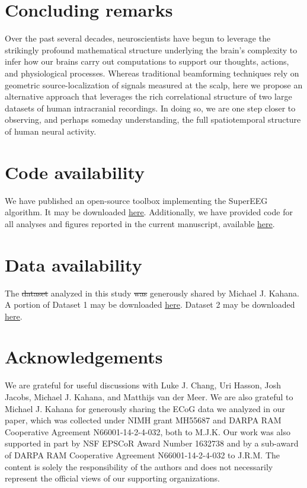 \documentclass[10pt]{article}
\providecommand{\DIFaddtex}[1]{{\protect\color{blue}\uwave{#1}}} %
\providecommand{\DIFdeltex}[1]{{\protect\color{red}\sout{#1}}}                      %
\providecommand{\DIFaddbegin}{} %
\providecommand{\DIFaddend}{} %
\providecommand{\DIFdelbegin}{} %
\providecommand{\DIFdelend}{} %
\providecommand{\DIFadd}[1]{\texorpdfstring{\DIFaddtex{#1}}{#1}} %
\providecommand{\DIFdel}[1]{\texorpdfstring{\DIFdeltex{#1}}{}} %
\newcommand{\DIFscaledelfig}{0.5}
\newlength{\DIFdelgraphicswidth} %
\newlength{\DIFdelgraphicsheight} %
\newcommand{\DIFaddincludegraphics}[2][]{{\color{blue}\fbox{\DIFOincludegraphics[#1]{#2}}}} %
\newcommand{\DIFdelincludegraphics}[2][]{%
\sbox{\DIFdelgraphicsbox}{\DIFOincludegraphics[#1]{#2}}%
\settoboxwidth{\DIFdelgraphicswidth}{\DIFdelgraphicsbox} %
\settoboxtotalheight{\DIFdelgraphicsheight}{\DIFdelgraphicsbox} %
\scalebox{\DIFscaledelfig}{%
\parbox[b]{\DIFdelgraphicswidth}{\usebox{\DIFdelgraphicsbox}\\[-\baselineskip] \rule{\DIFdelgraphicswidth}{0em}}\llap{\resizebox{\DIFdelgraphicswidth}{\DIFdelgraphicsheight}{%
\setlength{\unitlength}{\DIFdelgraphicswidth}%
\begin{picture}(1,1)%
\thicklines\linethickness{2pt} %
{\color[rgb]{1,0,0}\put(0,0){\framebox(1,1){}}}%
{\color[rgb]{1,0,0}\put(0,0){\line( 1,1){1}}}%
{\color[rgb]{1,0,0}\put(0,1){\line(1,-1){1}}}%
\end{picture}%
}\hspace*{3pt}}} %
} %
\DeclareRobustCommand{\DIFaddbegin}{\DIFOaddbegin \let\includegraphics\DIFaddincludegraphics} %
\DeclareRobustCommand{\DIFaddend}{\DIFOaddend \let\includegraphics\DIFOincludegraphics} %
\DeclareRobustCommand{\DIFdelbegin}{\DIFOdelbegin \let\includegraphics\DIFdelincludegraphics} %
\DeclareRobustCommand{\DIFdelend}{\DIFOaddend \let\includegraphics\DIFOincludegraphics} %
\begin{document}
\section*{Concluding remarks}
Over the past several decades, neuroscientists
have begun to leverage the strikingly profound mathematical structure underlying
the brain's complexity to infer how our brains carry out computations to support
our thoughts, actions, and physiological processes.  Whereas traditional
beamforming techniques rely on geometric source-localization of signals measured
at the scalp, here we propose an alternative approach that leverages the rich
correlational structure of two large datasets of human intracranial recordings.
In doing so, we are one step closer to observing, and perhaps someday
understanding, the full spatiotemporal structure of human neural activity.

\section*{Code availability}
We have published an open-source toolbox
implementing the SuperEEG algorithm.  It may be downloaded
\href{https://supereeg.readthedocs.io/en/latest/}{\underline{here}}.
Additionally, we have provided code for all analyses and figures reported in the
current manuscript, available
\href{https://github.com/ContextLab/supereeg_paper}{\underline{here}}.

\section*{Data availability}
The \DIFdelbegin \DIFdel{dataset }\DIFdelend \DIFaddbegin \DIFadd{datasets }\DIFaddend analyzed in this study \DIFdelbegin \DIFdel{was }\DIFdelend \DIFaddbegin \DIFadd{were }\DIFaddend generously shared by Michael
J. Kahana.  A portion of Dataset 1 may be downloaded
\href{http://memory.psych.upenn.edu/Request_EEG_access?paper=SedeEtal03}{\underline{here}}.
Dataset 2 may be downloaded
\href{http://memory.psych.upenn.edu/Request_EEG_access?paper=EzzyEtal17}{\underline{here}}.

\section*{Acknowledgements}
We are grateful for useful discussions with Luke J.
Chang, Uri Hasson, Josh Jacobs, Michael J. Kahana, and Matthijs van der Meer.
We are also grateful to Michael J. Kahana for generously sharing the ECoG data
we analyzed in our paper, which was collected under NIMH grant MH55687 and DARPA
RAM Cooperative Agreement N66001-14-2-4-032, both to M.J.K.  Our work was also
supported in part by NSF EPSCoR Award Number 1632738 and by a sub-award of DARPA
RAM Cooperative Agreement N66001-14-2-4-032 to J.R.M.  The content is solely the
responsibility of the authors and does not necessarily represent the official
views of our supporting organizations.
\end{document}
